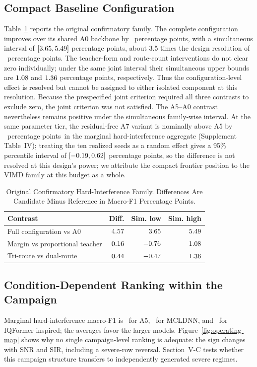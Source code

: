 \documentclass[letterpaper,journal]{IEEEtran}
\newcommand{\pp}{percentage points}
\begin{document}
\subsection{Compact Baseline Configuration}
Table~\ref{tab:confirmatory} reports the original confirmatory family. The complete
configuration improves over its shared A0 backbone by \MethodEffectDiff\ \pp,
with a simultaneous interval of
$[3.65,5.49]$ \pp, about 3.5 times
the design resolution of \DesignResolution\ \pp. The teacher-form and
route-count interventions do not clear zero individually; under the same joint
interval their simultaneous upper bounds are $1.08$ and
$1.36$ \pp, respectively.
Thus the configuration-level effect is resolved but cannot be assigned to
either isolated component at this resolution. Because the prespecified joint
criterion required all three contrasts to exclude zero, the joint criterion
was not satisfied. The A5--A0 contrast nevertheless remains positive under the
simultaneous family-wise interval. At the same
parameter tier, the residual-free A7 variant is nominally above A5 by
\ASevenVsAFiveHardDiff\ \pp\ in the marginal hard-interference aggregate
(Supplement Table~IV); treating the ten realized seeds as a random effect
gives a 95\% percentile interval of
$[-0.19,0.62]$ \pp, so the difference is not
resolved at this design's power; we attribute the compact frontier
position to the VIMD family at this budget as a whole.

\begin{table}[t]
\centering
\caption{Original Confirmatory Hard-Interference Family. Differences Are
Candidate Minus Reference in Macro-F1 Percentage Points.}
\label{tab:confirmatory}
\footnotesize
\setlength{\tabcolsep}{3.2pt}
\begin{tabular}{lrrr}
\toprule
Contrast & Diff. & Sim. low & Sim. high\\
\midrule
Full configuration vs A0 & $4.57$ & $3.65$ & $5.49$\\
Margin vs proportional teacher & $0.16$ & $-0.76$ & $1.08$\\
Tri-route vs dual-route & $0.44$ & $-0.47$ & $1.36$\\
\bottomrule
\end{tabular}
\end{table}

\subsection{Condition-Dependent Ranking within the Campaign}
Marginal hard-interference macro-F1 is \AbsAFiveHard\ for A5,
\AbsMCLDNNHard\ for MCLDNN, and \AbsIQFormerHard\ for IQFormer-inspired;
the averages favor the larger models. Figure~\ref{fig:operating-map} shows why no
single campaign-level ranking is adequate: the sign changes with SNR and SIR,
including a severe-row reversal. Section~V-C tests whether this campaign
structure transfers to independently generated severe regimes.
\end{document}
